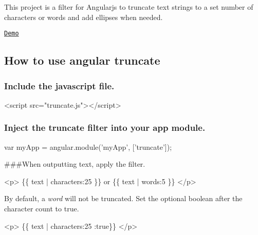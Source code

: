 This project is a filter for Angularjs to truncate text strings to a set number of characters or words and add ellipses when needed.

\href{http://sparkalow.github.io/angular-truncate/}{\tt Demo}

\subsection*{How to use angular truncate}

\subsubsection*{Include the javascript file.}


\begin{DoxyCode}
<script src="truncate.js"></script>
\end{DoxyCode}


\subsubsection*{Inject the {\ttfamily truncate} filter into your app module.}


\begin{DoxyCode}
var myApp = angular.module('myApp', ['truncate']);
\end{DoxyCode}


\#\#\#\+When outputting text, apply the filter. 
\begin{DoxyCode}
 <p>
    \{\{ text | characters:25 \}\} or \{\{ text | words:5 \}\}
</p>
\end{DoxyCode}


By default, a {\itshape word} will not be truncated. Set the optional boolean after the character count to true. 
\begin{DoxyCode}
<p>
    \{\{ text | characters:25 :true\}\}
</p>
\end{DoxyCode}
 
